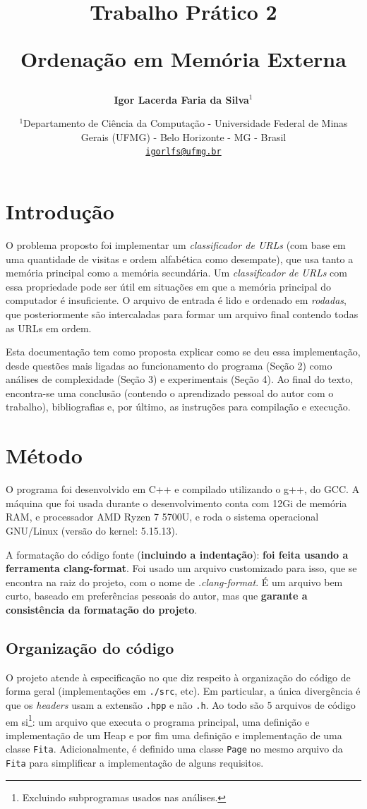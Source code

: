 \documentclass{article}
\author{\textbf{Igor Lacerda Faria da Silva\( ^1 \)} }
\title{\textbf{Trabalho Prático 2}

\textbf{Ordenação em Memória Externa}}
\date{%
    \( ^1 \)Departamento de Ciência da Computação - Universidade Federal de Minas Gerais (UFMG) - Belo Horizonte - MG - Brasil \\ [2ex]
    \href{mailto:igorlfs@ufmg.br}{\nolinkurl{igorlfs@ufmg.br}}
}
\def\code#1{\texttt{#1}}
\begin{document}
\maketitle

\section{Introdução}

O problema proposto foi implementar um \textit{classificador de URLs} (com base em uma quantidade de visitas e ordem alfabética como desempate), que usa tanto a memória principal como a memória secundária. Um \textit{classificador de URLs} com essa propriedade pode ser útil em situações em que a memória principal do computador é insuficiente. O arquivo de entrada é lido e ordenado em \textit{rodadas}, que posteriormente são intercaladas para formar um arquivo final contendo todas as URLs em ordem.

Esta documentação tem como proposta explicar como se deu essa implementação, desde questões mais ligadas ao funcionamento do programa (Seção 2) como análises de complexidade (Seção 3) e experimentais (Seção 4). Ao final do texto, encontra-se uma conclusão (contendo o aprendizado pessoal do autor com o trabalho), bibliografias e, por último, as instruções para compilação e execução.

\section{Método}

O programa foi desenvolvido em C++ e compilado utilizando o g++, do GCC. A máquina que foi usada durante o desenvolvimento conta com 12Gi de memória RAM, e processador AMD Ryzen 7 5700U, e roda o sistema operacional GNU/Linux (versão do kernel: 5.15.13).

A formatação do código fonte (\textbf{incluindo a indentação}): \textbf{foi feita usando a ferramenta clang-format}. Foi usado um arquivo customizado para isso, que se encontra na raiz do projeto, com o nome de \textit{.clang-format}. É um arquivo bem curto, baseado em preferências pessoais do autor, mas que \textbf{garante a consistência da formatação do projeto}.


\subsection{Organização do código}

O projeto atende à especificação no que diz respeito à organização do código de forma geral (implementações em \code{./src}, etc). Em particular, a única divergência é que os \emph{headers} usam a extensão \code{.hpp} e não \code{.h}. Ao todo são 5 arquivos de código em si\footnote{Excluindo subprogramas usados nas análises.}: um arquivo que executa o programa principal, uma definição e implementação de um Heap e por fim uma definição e implementação de uma classe \code{Fita}. Adicionalmente, é definido uma classe \code{Page} no mesmo arquivo da \code{Fita} para simplificar a implementação de alguns requisitos.
\end{document}
